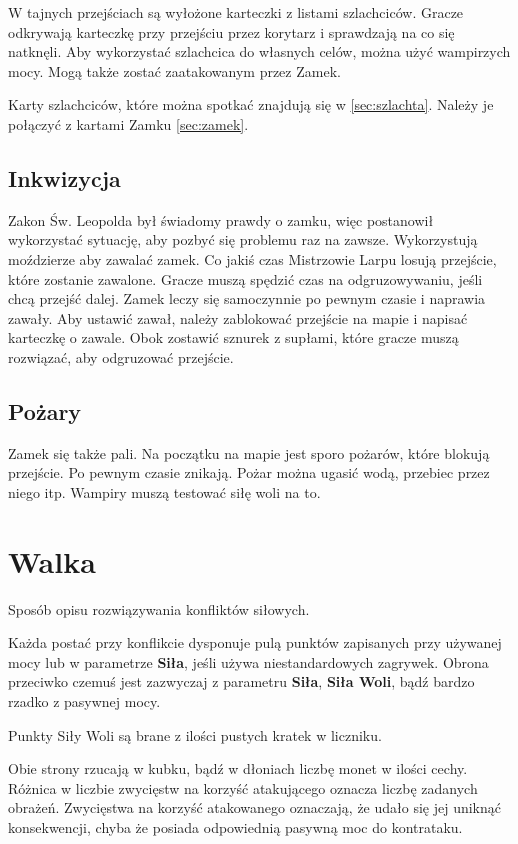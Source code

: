 		W tajnych przejściach są wyłożone karteczki z listami szlachciców.
		Gracze odkrywają karteczkę przy przejściu przez korytarz i sprawdzają na co się natknęli.
		Aby wykorzystać szlachcica do własnych celów, można użyć wampirzych mocy.
		Mogą także zostać zaatakowanym przez Zamek.
		
		Karty szlachciców, które można spotkać znajdują się w \ref{sec:szlachta}.
		Należy je połączyć z kartami Zamku \ref{sec:zamek}.
		
	\subsection{Inkwizycja}
		Zakon Św. Leopolda był świadomy prawdy o zamku, więc postanowił wykorzystać sytuację, aby pozbyć się problemu raz na zawsze.
		Wykorzystują moździerze aby zawalać zamek.
		Co jakiś czas Mistrzowie Larpu losują przejście, które zostanie zawalone.
		Gracze muszą spędzić czas na odgruzowywaniu, jeśli chcą przejść dalej.
		Zamek leczy się samoczynnie po pewnym czasie i naprawia zawały.
		Aby ustawić zawał, należy zablokować przejście na mapie i napisać karteczkę o zawale.
		Obok zostawić sznurek z supłami, które gracze muszą rozwiązać, aby odgruzować przejście.

	\subsection{Pożary}
		Zamek się także pali. Na początku na mapie jest sporo pożarów, które blokują przejście.
		Po pewnym czasie znikają.
		Pożar można ugasić wodą, przebiec przez niego itp.
		Wampiry muszą testować siłę woli na to.

\section{Walka}
	Sposób opisu rozwiązywania konfliktów siłowych.
	
	Każda postać przy konflikcie dysponuje pulą punktów zapisanych przy używanej mocy lub w parametrze \textbf{Siła}, jeśli używa niestandardowych zagrywek.
	Obrona przeciwko czemuś jest zazwyczaj z parametru \textbf{Siła}, \textbf{Siła Woli}, bądź bardzo rzadko z pasywnej mocy.
	
	Punkty Siły Woli są brane z ilości pustych kratek w liczniku.
	
	Obie strony rzucają w kubku, bądź w dłoniach liczbę monet w ilości cechy.
	Różnica w liczbie zwycięstw na korzyść atakującego oznacza liczbę zadanych obrażeń.
	Zwycięstwa na korzyść atakowanego oznaczają, że udało się jej uniknąć konsekwencji, chyba że posiada odpowiednią pasywną moc do kontrataku.
	
